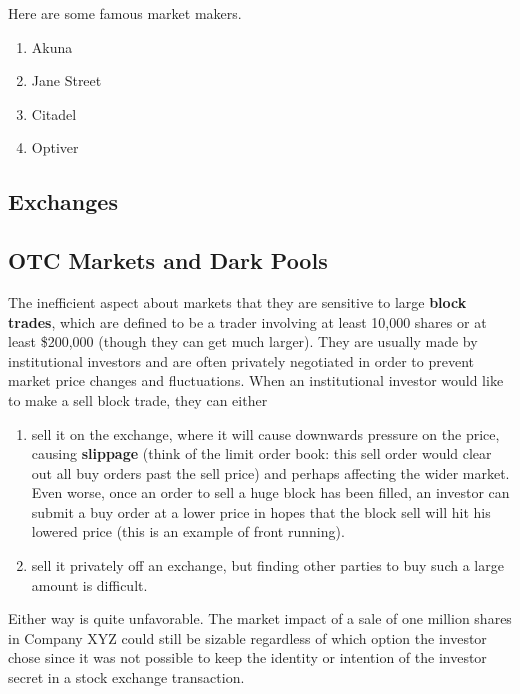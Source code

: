 \documentclass{article}
\begin{document}
    \begin{example}
      Here are some famous market makers. 
      \begin{enumerate}
        \item Akuna
        \item Jane Street 
        \item Citadel 
        \item Optiver 
      \end{enumerate}
    \end{example}

  \subsection{Exchanges}

  \subsection{OTC Markets and Dark Pools}

    The inefficient aspect about markets that they are sensitive to large \textbf{block trades}, which are defined to be a trader involving at least 10,000 shares or at least \$200,000 (though they can get much larger). They are usually made by institutional investors and are often privately negotiated in order to prevent market price changes and fluctuations. When an institutional investor would like to make a sell block trade, they can either 

    \begin{enumerate}
      \item sell it on the exchange, where it will cause downwards pressure on the price, causing \textbf{slippage} (think of the limit order book: this sell order would clear out all buy orders past the sell price) and perhaps affecting the wider market. Even worse, once an order to sell a huge block has been filled, an investor can submit a buy order at a lower price in hopes that the block sell will hit his lowered price (this is an example of front running). 

      \item sell it privately off an exchange, but finding other parties to buy such a large amount is difficult. 
    \end{enumerate}

    Either way is quite unfavorable. The market impact of a sale of one million shares in Company XYZ could still be sizable regardless of which option the investor chose since it was not possible to keep the identity or intention of the investor secret in a stock exchange transaction. 
\end{document}
